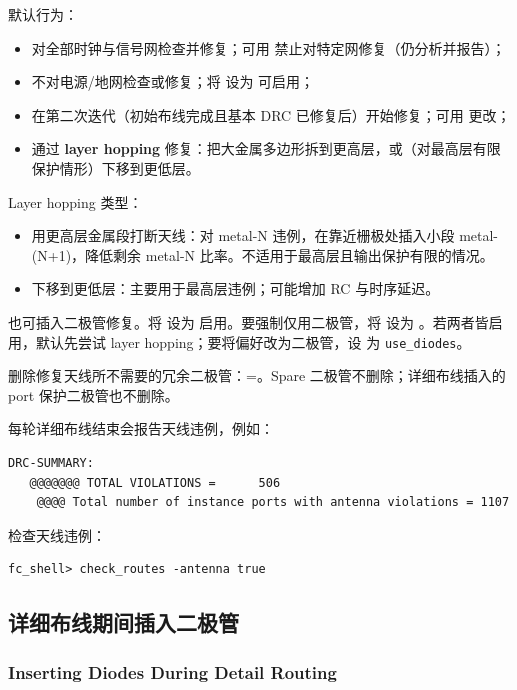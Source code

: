 默认行为：
\begin{itemize}
  \item 对全部时钟与信号网检查并修复；可用  禁止对特定网修复（仍分析并报告）；
  \item 不对电源/地网检查或修复；将  设为  可启用；
  \item 在第二次迭代（初始布线完成且基本 DRC 已修复后）开始修复；可用  更改；
  \item 通过 \textbf{layer hopping} 修复：把大金属多边形拆到更高层，或（对最高层有限保护情形）下移到更低层。
\end{itemize}

Layer hopping 类型：
\begin{itemize}
  \item 用更高层金属段打断天线：对 metal-N 违例，在靠近栅极处插入小段 metal-(N+1)，降低剩余 metal-N 比率。不适用于最高层且输出保护有限的情况。
  \item 下移到更低层：主要用于最高层违例；可能增加 RC 与时序延迟。
\end{itemize}

也可插入二极管修复。将  设为  启用。要强制仅用二极管，将  设为 。若两者皆启用，默认先尝试 layer hopping；要将偏好改为二极管，设  为 \texttt{use\_diodes}。

删除修复天线所不需要的冗余二极管：=。Spare 二极管不删除；详细布线插入的 port 保护二极管也不删除。

每轮详细布线结束会报告天线违例，例如：
\begin{lstlisting}
DRC-SUMMARY:
   @@@@@@@ TOTAL VIOLATIONS =      506
    @@@@ Total number of instance ports with antenna violations = 1107
\end{lstlisting}

检查天线违例：
\begin{lstlisting}
fc_shell> check_routes -antenna true
\end{lstlisting}

\subsection{详细布线期间插入二极管}
\subsubsection*{Inserting Diodes During Detail Routing}

